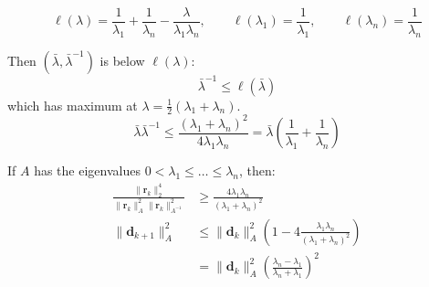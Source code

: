 \documentclass[../../main.tex]{subfiles}
\begin{document}
\[ \ell(\lambda) = \frac{1}{\lambda_1} + \frac{1}{\lambda_n} - \frac{\lambda}{\lambda_1 \lambda_n}, \qquad \ell(\lambda_1) = \frac{1}{\lambda_1}, \qquad \ell(\lambda_n) = \frac{1}{\lambda_n} \]

Then $(\bar\lambda, \bar{\lambda}^{-1})$ is below $\ell(\lambda)$:
\[
    \bar\lambda^{-1} \leq \ell(\bar\lambda)
\]
which has maximum at $\lambda = \tfrac12(\lambda_1 + \lambda_n)$.
\[
    \bar\lambda \bar\lambda^{-1} \leq \frac{(\lambda_1 + \lambda_n)^2}{4 \lambda_1 \lambda_n} = \bar\lambda\left(\frac{1}{\lambda_1} + \frac{1}{\lambda_n}\right)
\]


If $A$ has the eigenvalues $0 < \lambda_1 \leq \ldots \leq \lambda_n$, then:
\begin{align*}
    \frac{\|\mathbf{r}_k\|_2^4}{\|\mathbf{r}_k\|_A^2 \|\mathbf{r}_k\|_{A^{-1}}^2} & \geq \frac{4 \lambda_1 \lambda_n}{(\lambda_1 + \lambda_n)^2}                                      \\
    \|\mathbf{d}_{k+1}\|_A^2                                                      & \leq \|\mathbf{d}_k\|_A^2\left(1 - 4 \frac{\lambda_1 \lambda_n}{(\lambda_1 + \lambda_n)^2}\right) \\
                                                                                  & = \|\mathbf{d}_k\|_A^2\left(\frac{\lambda_n - \lambda_1}{\lambda_n + \lambda_1}\right)^2
\end{align*}
\end{document}

